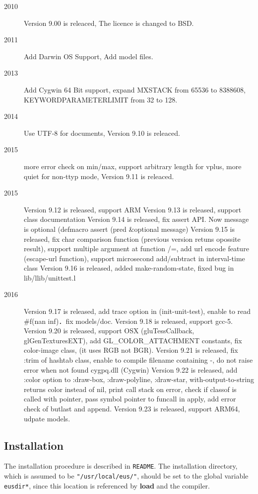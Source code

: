\begin{description}
\item[2010] Version 9.00 is releaced, The licence is changed to BSD.
\item[2011] Add Darwin OS Support, Add model files.
\item[2013] Add Cygwin 64 Bit support, expand MXSTACK from 65536 to 8388608, KEYWORDPARAMETERLIMIT from 32 to 128.
\item[2014] Use UTF-8 for documents, Version 9.10 is releaced.
\item[2015] more error check on min/max, support arbitrary length for vplus, more quiet for non-ttyp mode, Version 9.11 is releaced.
\item[2015] Version 9.12 is released, support ARM
            Version 9.13 is released, support class documentation
            Version 9.14 is released, fix assert API. Now message is optional (defmacro assert (pred \&optional message)
            Version 9.15 is released, fix char comparison function (previous version retuns opossite result), support multiple argument at function /=,  add url encode feature (escape-url function), support microsecond add/subtract in interval-time class
            Version 9.16 is released, added make-random-state, fixed bug in lib/llib/unittest.l
\item[2016] Version 9.17 is released, add trace option in (init-unit-test), enable to read \#f(nan inf)．fix models/doc.
            Version 9.18 is released, support gcc-5.
            Version 9.20 is released, support OSX (gluTessCallback, glGenTexturesEXT), add GL\_COLOR\_ATTACHMENT constants, fix color-image class, (it uses RGB not BGR).
            Version 9.21 is released, fix :trim of hashtab class, enable to compile filename containing -, do not raise error when not found cygpq.dll (Cygwin)
            Version 9.22 is released, add :color option to :draw-box, :draw-polyline, :draw-star, with-output-to-string returns color instead of nil, print call stack on error, check if classof is called with pointer, pass symbol pointer to funcall in apply, add error check of butlast and append.
            Version 9.23 is released, support ARM64, udpate models.
\end{description}

\subsection{Installation}
The installation procedure is described in {\tt README}.
The installation directory, which is assumed to be {\tt "/usr/local/eus/"},
should be set to the global variable 
{\tt *eusdir*}, since this location is referenced
by {\bf load} and the compiler.

